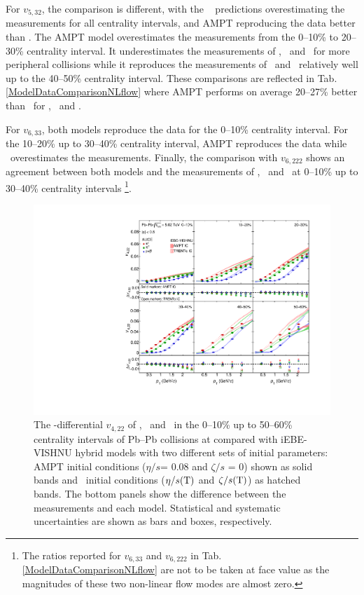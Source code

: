 For $v_{5,32}$, the comparison is different, with the \trento~ predictions overestimating the measurements for all centrality intervals, and AMPT reproducing the data better than \trento. The AMPT model overestimates the measurements from the 0--10\% to 20--30\% centrality interval. It underestimates the measurements of \pion, \kaon~and \proton~for more peripheral collisions while it reproduces the measurements of \Ks~and \lambdas~relatively well up to the 40--50\% centrality interval. These comparisons are reflected in Tab. \ref{ModelDataComparisonNLflow} where AMPT performs on average 20--27\% better than \trento~for \pion, \kaon~and \proton. 

For $v_{6,33}$, both models reproduce the data for the 0--10\% centrality interval. For the 10--20\% up to 30--40\% centrality interval, AMPT reproduces the data while \trento~overestimates the measurements. Finally, the comparison with $v_{6,222}$ shows an agreement between both models and the measurements of \pion, \kaon~and \proton~at 0--10\% up to 30--40\% centrality intervals  \footnote{The ratios reported for $v_{6,33}$ and $v_{6,222}$ in Tab. \ref{ModelDataComparisonNLflow} are not to be taken at face value as the magnitudes of these two non-linear flow modes are almost zero.}. 


 \begin{figure}[h]
\begin{center}
\includegraphics[scale=0.73]{figures/model/TrentoAndAMPT_v422_gap00_PID2.pdf}
\end{center}
\caption{The \pT-differential $v_{4,22}$ of \pion, \kaon~and \proton~in the 0--10\% up to 50--60\% centrality intervals of Pb--Pb collisions at \sNN compared with iEBE-VISHNU hybrid models with two different sets of initial parameters: AMPT initial conditions ($\eta/s$= 0.08 and $\zeta/s$ = 0) shown as solid bands and \trento~initial conditions ($\eta/s({\rm T})$ and $\zeta/s({\rm T})$) as hatched bands. The bottom panels show the difference between the measurements and each model. Statistical and systematic uncertainties are shown as bars and boxes, respectively.}
\label{v422_model}
\end{figure}

